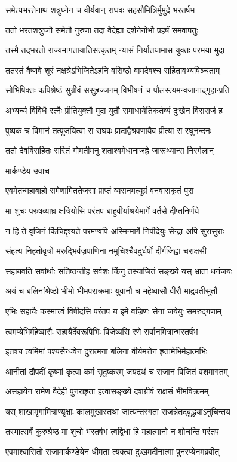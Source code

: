 \twolineshloka
{समेत्यभरतेनाथ शत्रुघ्नेन च वीर्यवान्}
{राघवः सहसौमित्रिर्मुमुदे भरतर्षभ}


\twolineshloka
{ततो भरतशत्रुघ्नौ समेतौ गुरुणा तदा}
{वैदेह्या दर्शनेनोभौ प्रहर्षं समवापतुः}


\twolineshloka
{तस्मै तद्भरतो राज्यमागतायातिसत्कृतम्}
{न्यासं निर्यातयामास युक्तः परमया मुदा}


\twolineshloka
{ततस्तं वैष्णवे शूरं नक्षत्रेऽभिजितेऽहनि}
{वसिष्ठो वामदेवश्च सहितावभ्यषिञ्चताम्}


\twolineshloka
{सोभिषिक्तः कपिश्रेष्ठं सुग्रीवं ससुहृज्जनम्}
{विभीषणं च पौलस्त्यमन्वजानाद्गृहान्प्रति}


\twolineshloka
{अभ्यर्च्य विविधै रत्नैः प्रीतियुक्तौ मुदा युतौ}
{समाधायेतिकर्तव्यं दुःखेन विससर्ज ह}


\twolineshloka
{पुष्पकं च विमानं तत्पूजयित्वा स राघवः}
{प्रादाद्वैश्रवणायैव प्रीत्या स रघुनन्दनः}


\twolineshloka
{ततो देवर्षिसहितः सरितं गोमतीमनु}
{शताश्वमेधानाजह्रे जारूथ्यान्स निरर्गलान्}


\twolineshloka
{मार्कण्डेय उवाच}
{}


\twolineshloka
{एवमेतन्महाबाहो रामेणामिततेजसा}
{प्राप्तं व्यसनमत्युग्रं वनवासकृतं पुरा}


\twolineshloka
{मा शुचः परुषव्याघ्र क्षत्रियोसि परंतप}
{बाहुवीर्याश्रयेमार्गे वर्तसे दीप्तनिर्णये}


\twolineshloka
{न हि ते वृजिनं किंचिद्दृश्यते परमण्वपि}
{अस्मिन्मार्गे निपीदेयुः सेन्द्रा अपि सुरासुराः}


\twolineshloka
{संहत्य निहतोवृत्रो मरुद्भिर्वज्रपाणिना}
{नमुचिश्चैवदुर्धर्षो दीर्गजिह्वा चराक्षसी}


\twolineshloka
{सहायवति सर्वार्थाः सतिष्ठन्तीह सर्वशः}
{किंनु तस्याजितं सङ्ख्ये यस् भ्राता धनंजयः}


\twolineshloka
{अयं च बलिनांश्रेष्ठो भीमो भीमपराक्रमाः}
{युवानौ च महेष्वासौ वीरौ माद्रवतीसुतौ}


\twolineshloka
{एभिः सहायैः कस्मात्त्वं विषीदसि परंतप}
{य इमे वज्रिणः सेनां जयेयुः समरुद्गणाम्}


\twolineshloka
{त्वमप्येभिर्महेष्वासैः सहायैर्देवरूपिभिः}
{विजेष्यसि रणे सर्वानमित्रान्भरतर्षभ}


\twolineshloka
{इतश्च त्वमिमां पश्यसैन्धवेन दुरात्मना}
{बलिना वीर्यमत्तेन हृतामेभिर्महात्मभिः}


\twolineshloka
{आनीतां द्रौपदीं कृष्णां कृत्वा कर्म सुदुष्करम्}
{जयद्रथं च राजानं विजितं वशमागतम्}


\twolineshloka
{असहायेन रामेण वैदेही पुनराहृता}
{हत्वासङ्ख्ये दशग्रीवं राक्षसं भीमविक्रमम्}


\twolineshloka
{यस् शाखामृगामित्राण्यृक्षाः कालमुखास्तथा}
{जात्यन्तरगता राजन्नेतद्बुद्ध्याऽनुचिन्तय}


\twolineshloka
{तस्मात्सर्वं कुरुश्रेष्ठ मा शुचो भरतर्षभ}
{त्वद्विधा हि महात्मानो न शोचन्ति परंतप}



\twolineshloka
{एवमाश्वासितो राजामार्कण्डेयेन धीमता}
{त्यक्त्वा दुःखमदीनात्मा पुनरप्येनमब्रवीत्}

